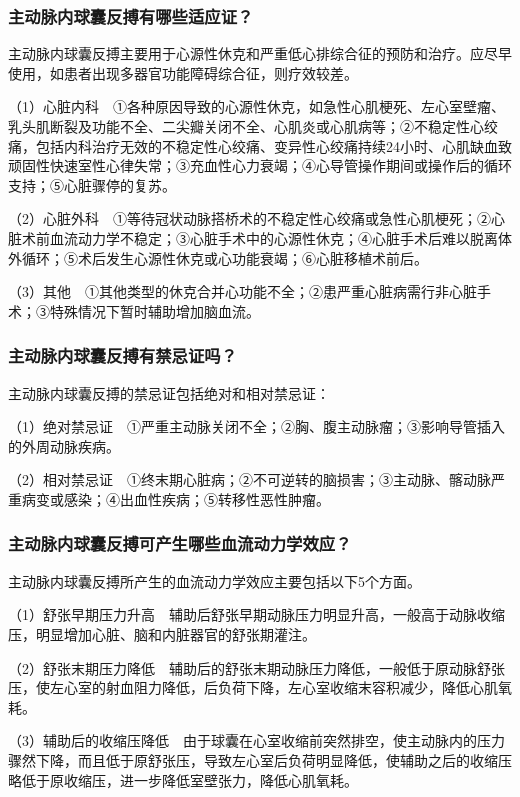 \subsubsection{主动脉内球囊反搏有哪些适应证？}

主动脉内球囊反搏主要用于心源性休克和严重低心排综合征的预防和治疗。应尽早使用，如患者出现多器官功能障碍综合征，则疗效较差。

（1）心脏内科　①各种原因导致的心源性休克，如急性心肌梗死、左心室壁瘤、乳头肌断裂及功能不全、二尖瓣关闭不全、心肌炎或心肌病等；②不稳定性心绞痛，包括内科治疗无效的不稳定性心绞痛、变异性心绞痛持续24小时、心肌缺血致顽固性快速室性心律失常；③充血性心力衰竭；④心导管操作期间或操作后的循环支持；⑤心脏骤停的复苏。

（2）心脏外科　①等待冠状动脉搭桥术的不稳定性心绞痛或急性心肌梗死；②心脏术前血流动力学不稳定；③心脏手术中的心源性休克；④心脏手术后难以脱离体外循环；⑤术后发生心源性休克或心功能衰竭；⑥心脏移植术前后。

（3）其他　①其他类型的休克合并心功能不全；②患严重心脏病需行非心脏手术；③特殊情况下暂时辅助增加脑血流。

\subsubsection{主动脉内球囊反搏有禁忌证吗？}

主动脉内球囊反搏的禁忌证包括绝对和相对禁忌证：

（1）绝对禁忌证　①严重主动脉关闭不全；②胸、腹主动脉瘤；③影响导管插入的外周动脉疾病。

（2）相对禁忌证　①终末期心脏病；②不可逆转的脑损害；③主动脉、髂动脉严重病变或感染；④出血性疾病；⑤转移性恶性肿瘤。

\subsubsection{主动脉内球囊反搏可产生哪些血流动力学效应？}

主动脉内球囊反搏所产生的血流动力学效应主要包括以下5个方面。

（1）舒张早期压力升高　辅助后舒张早期动脉压力明显升高，一般高于动脉收缩压，明显增加心脏、脑和内脏器官的舒张期灌注。

（2）舒张末期压力降低　辅助后的舒张末期动脉压力降低，一般低于原动脉舒张压，使左心室的射血阻力降低，后负荷下降，左心室收缩末容积减少，降低心肌氧耗。

（3）辅助后的收缩压降低　由于球囊在心室收缩前突然排空，使主动脉内的压力骤然下降，而且低于原舒张压，导致左心室后负荷明显降低，使辅助之后的收缩压略低于原收缩压，进一步降低室壁张力，降低心肌氧耗。

